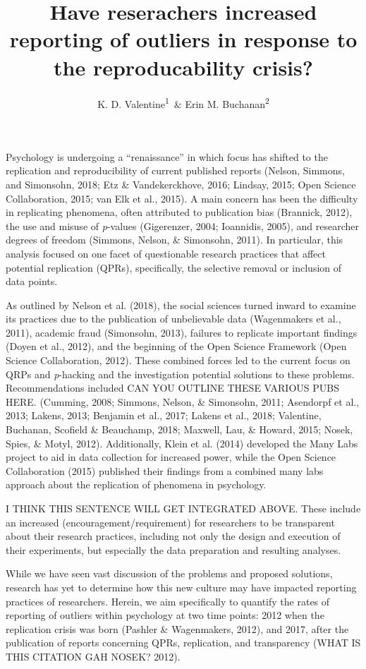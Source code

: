 \documentclass[english,man]{apa6}
\title{Have reserachers increased reporting of outliers in response to the
reproducability crisis?}
\author{K. D. Valentine\textsuperscript{1}~\& Erin M. Buchanan\textsuperscript{2}}
\affiliation{
    \vspace{0.5cm}
          \textsuperscript{1} University of Missouri\\
          \textsuperscript{2} Missouri State University  }
\theoremstyle{definition}
\theoremstyle{definition}
\theoremstyle{definition}
\theoremstyle{remark}
\begin{document}
\maketitle

\setcounter{secnumdepth}{0}



Psychology is undergoing a \enquote{renaissance} in which focus has
shifted to the replication and reproducibility of current published
reports (Nelson, Simmons, and Simonsohn, 2018; Etz \& Vandekerckhove,
2016; Lindsay, 2015; Open Science Collaboration, 2015; van Elk et al.,
2015). A main concern has been the difficulty in replicating phenomena,
often attributed to publication bias (Brannick, 2012), the use and
misuse of \emph{p}-values (Gigerenzer, 2004; Ioannidis, 2005), and
researcher degrees of freedom (Simmons, Nelson, \& Simonsohn, 2011). In
particular, this analysis focused on one facet of questionable research
practices that affect potential replication (QPRs), specifically, the
selective removal or inclusion of data points.

As outlined by Nelson et al. (2018), the social sciences turned inward
to examine its practices due to the publication of unbelievable data
(Wagenmakers et al., 2011), academic fraud (Simonsohn, 2013), failures
to replicate important findings (Doyen et al., 2012), and the beginning
of the Open Science Framework (Open Science Collaboration, 2012). These
combined forces led to the current focus on QRPs and \emph{p}-hacking
and the investigation potential solutions to these problems.
Recommendations included CAN YOU OUTLINE THESE VARIOUS PUBS HERE.
(Cumming, 2008; Simmons, Nelson, \& Simonsohn, 2011; Asendorpf et al.,
2013; Lakens, 2013; Benjamin et al., 2017; Lakens et al., 2018;
Valentine, Buchanan, Scofield \& Beauchamp, 2018; Maxwell, Lau, \&
Howard, 2015; Nosek, Spies, \& Motyl, 2012). Additionally, Klein et al.
(2014) developed the Many Labs project to aid in data collection for
increased power, while the Open Science Collaboration (2015) published
their findings from a combined many labs approach about the replication
of phenomena in psychology.

I THINK THIS SENTENCE WILL GET INTEGRATED ABOVE. These include an
increased (encouragement/requirement) for researchers to be transparent
about their research practices, including not only the design and
execution of their experiments, but especially the data preparation and
resulting analyses.

While we have seen vast discussion of the problems and proposed
solutions, research has yet to determine how this new culture may have
impacted reporting practices of researchers. Herein, we aim specifically
to quantify the rates of reporting of outliers within psychology at two
time points: 2012 when the replication crisis was born (Pashler \&
Wagenmakers, 2012), and 2017, after the publication of reports
concerning QPRs, replication, and transparency (WHAT IS THIS CITATION
GAH NOSEK? 2012).
\end{document}
